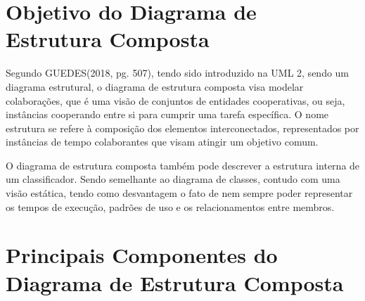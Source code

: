 \documentclass[12pt,openright,oneside,a4paper,
	chapter=TITLE,
	section=TITLE,
	english,brazil]{abntex2}
\begin{document}
\section{Objetivo do Diagrama de Estrutura Composta}

Segundo GUEDES(2018, pg. 507), tendo sido introduzido na UML 2, sendo um diagrama estrutural, o diagrama de estrutura composta visa modelar colaborações, que é uma visão de conjuntos de entidades cooperativas, ou seja, instâncias cooperando entre si para cumprir uma tarefa específica. O nome estrutura se refere à composição dos elementos interconectados, representados por instâncias de tempo colaborantes que visam atingir um objetivo comum.

O diagrama de estrutura composta também pode descrever a estrutura interna de um classificador. Sendo semelhante ao diagrama de classes, contudo com uma visão estática, tendo como desvantagem o fato de nem sempre poder representar os tempos de execução, padrões de uso e os relacionamentos entre membros.

\section{Principais Componentes do Diagrama de Estrutura Composta}
\end{document}
